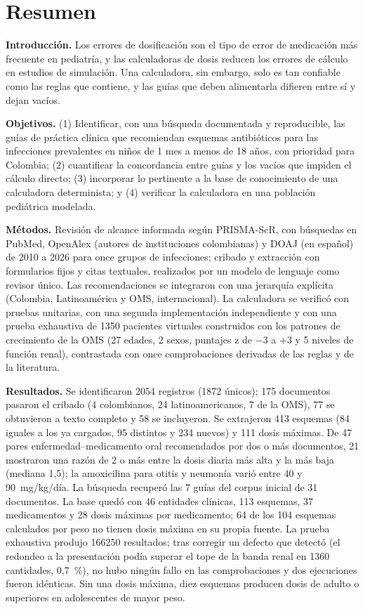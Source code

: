 \documentclass[11pt,a4paper]{article}
\begin{document}
\section*{Resumen}

\noindent\textbf{Introducción.} Los errores de dosificación son el tipo de error de medicación más frecuente en pediatría, y las calculadoras de dosis reducen los errores de cálculo en estudios de simulación. Una calculadora, sin embargo, solo es tan confiable como las reglas que contiene, y las guías que deben alimentarla difieren entre sí y dejan vacíos.

\noindent\textbf{Objetivos.} (1) Identificar, con una búsqueda documentada y reproducible, las guías de práctica clínica que recomiendan esquemas antibióticos para las infecciones prevalentes en niños de 1 mes a menos de 18 años, con prioridad para Colombia; (2) cuantificar la concordancia entre guías y los vacíos que impiden el cálculo directo; (3) incorporar lo pertinente a la base de conocimiento de una calculadora determinista; y (4) verificar la calculadora en una población pediátrica modelada.

\noindent\textbf{Métodos.} Revisión de alcance informada según PRISMA-ScR, con búsquedas en PubMed, OpenAlex (autores de instituciones colombianas) y DOAJ (en español) de 2010 a 2026 para once grupos de infecciones; cribado y extracción con formularios fijos y citas textuales, realizados por un modelo de lenguaje como revisor único. Las recomendaciones se integraron con una jerarquía explícita (Colombia, Latinoamérica y OMS, internacional). La calculadora se verificó con pruebas unitarias, con una segunda implementación independiente y con una prueba exhaustiva de \num{1350} pacientes virtuales construidos con los patrones de crecimiento de la OMS (27 edades, 2 sexos, puntajes z de $-3$ a $+3$ y 5 niveles de función renal), contrastada con once comprobaciones derivadas de las reglas y de la literatura.

\noindent\textbf{Resultados.} Se identificaron \num{2054} registros (\num{1872} únicos); 175 documentos pasaron el cribado (4 colombianos, 24 latinoamericanos, 7 de la OMS), 77 se obtuvieron a texto completo y 58 se incluyeron. Se extrajeron 413 esquemas (84 iguales a los ya cargados, 95 distintos y 234 nuevos) y 111 dosis máximas. De 47 pares enfermedad--medicamento oral recomendados por dos o más documentos, 21 mostraron una razón de 2 o más entre la dosis diaria más alta y la más baja (mediana 1,5); la amoxicilina para otitis y neumonía varió entre 40 y 90~mg/kg/día. La búsqueda recuperó las 7 guías del corpus inicial de 31 documentos. La base quedó con 46 entidades clínicas, 113 esquemas, 37 medicamentos y 28 dosis máximas por medicamento; 64 de los 104 esquemas calculados por peso no tienen dosis máxima en su propia fuente. La prueba exhaustiva produjo \num{166250} resultados; tras corregir un defecto que detectó (el redondeo a la presentación podía superar el tope de la banda renal en \num{1360} cantidades, 0,7~\%), no hubo ningún fallo en las comprobaciones y dos ejecuciones fueron idénticas. Sin una dosis máxima, diez esquemas producen dosis de adulto o superiores en adolescentes de mayor peso.
\end{document}
